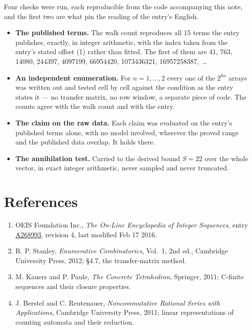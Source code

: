 \documentclass[11pt]{article}
\theoremstyle{definition}
\begin{document}
Four checks were run, each reproducible from the code accompanying this note, and the first two are what pin the reading of the entry's English.

\begin{itemize}

\item {\bfseries The published terms.} The walk count reproduces all 15 terms the entry publishes, exactly, in integer arithmetic, with the index taken from the entry's stated offset (1) rather than fitted. The first of them are 41, 763, 14080, 244397, 4097199, 66954420, 1073436321, 16957258387,~\dots

\item {\bfseries An independent enumeration.} For $n = 1,\dots,2$ every one of the $2^{6n}$ arrays was written out and tested cell by cell against the condition as the entry states it --- no transfer matrix, no row window, a separate piece of code. The counts agree with the walk count and with the entry.

\item {\bfseries The claim on the raw data.} Each claim was evaluated on the entry's published terms alone, with no model involved, wherever the proved range and the published data overlap. It holds there.

\item {\bfseries The annihilation test.} Carried to the derived bound $S = 22$ over the whole vector, in exact integer arithmetic, never sampled and never truncated.

\end{itemize}

\section{References}

\begin{enumerate}

\item OEIS Foundation Inc., \emph{The On-Line Encyclopedia of Integer Sequences}, entry \href{https://oeis.org/A268993}{A268993}, revision 4, last modified Feb 17 2016.

\item R. P. Stanley, \emph{Enumerative Combinatorics}, Vol.~1, 2nd ed., Cambridge University Press, 2012; \S4.7, the transfer-matrix method.

\item M. Kauers and P. Paule, \emph{The Concrete Tetrahedron}, Springer, 2011; C-finite sequences and their closure properties.

\item J. Berstel and C. Reutenauer, \emph{Noncommutative Rational Series with Applications}, Cambridge University Press, 2011; linear representations of counting automata and their reduction.

\end{enumerate}
\end{document}
